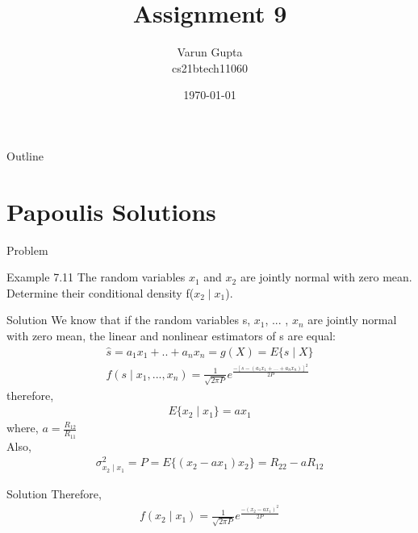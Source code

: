 \documentclass{beamer}
\title{Assignment 9}
\author{Varun Gupta \\ cs21btech11060}
\date{\today}
\begin{document}
\begin{frame}
    \titlepage
\end{frame}

\logo{}


\begin{frame}{Outline}
    \tableofcontents
\end{frame}
\section{Papoulis Solutions}
\begin{frame}{Problem}
    \begin{block}{Example 7.11}
        The random variables $x_1$ and $x_2$ are jointly normal with zero mean. Determine their conditional density f($x_2 \mid x_1$).
    \end{block}
\end{frame}
\begin{frame}{Solution}
    We know that if the random variables s, $x_1$, ... , $x_{n}$ are jointly normal with zero mean, the linear and nonlinear estimators of s are equal:
    \begin{align}
        \hat{s} = a_1 x_1 + .. + a_{n} x_{n} = g(X) = E\{s \mid X\}\\
        f(s \mid x_1, ..., x_{n}) = \frac{1}{\sqrt{2\pi P}}e^{\frac{-[s-(a_1x_1+...+a_{n}x_{n})]^2}{2P}}
    \end{align}
    therefore,
    \begin{align}
        E\{x_2 \mid x_1\} = a x_1
    \end{align}
    where, $a = \frac{R_{12}}{R_{11}}$\\
    Also,
    \begin{align}
        \sigma^2_{x_2 \mid x_1} = P = E\{(x_2-a x_1)x_2\}=R_{22}-aR_{12}
    \end{align}
\end{frame}
\begin{frame}{Solution}
        Therefore,
        \begin{align}
            f(x_2 \mid x_1) = \frac{1}{\sqrt{2\pi P}}e^{\frac{-(x_2-a x_1)^2}{2P}}
        \end{align}
\end{frame}
\end{document}
